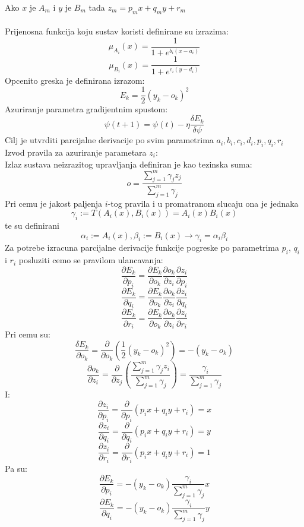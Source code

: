 \documentclass[a4paper, 11pt]{article}
\begin{document}
Ako $x$ je $A_{m}$ i $y$ je $B_{m}$ tada $z_{m}=p_{m}x+q_{m}y+r_{m}$\\
\\
Prijenosna funkcija koju sustav koristi definirane su izrazima:
$$\mu_{A_{i}}(x)=\frac{1}{1+e^{b_{i}(x-a_{i})}}$$
$$\mu_{B_{i}}(x)=\frac{1}{1+e^{c_{i}(y-d_{i})}}$$
Opcenito greska je definirana izrazom:
$$E_{k}=\frac{1}{2}(y_{k}-o_{k})^{2}$$
Azuriranje parametra gradijentnim spustom:
$$\psi(t+1) = \psi(t)-\eta\frac{\delta E_{k}}{\delta\psi}$$
Cilj je utvrditi parcijalne derivacije po svim parametrima $a_{i},b_{i},c_{i},d_{i},p_{i},q_{i},r_{i}$\\
Izvod pravila za azuriranje parametara $z_{i}$:\\
Izlaz sustava neizrazitog upravljanja definiran je kao tezinska suma:
$$o = \frac{\sum_{j=1}^{m}\gamma_{j}z_{j}}{\sum_{j=1}^{m}\gamma_{j}}$$
Pri cemu je jakost paljenja $i$-tog pravila i u promatranom slucaju ona je jednaka 
$$\gamma _{i} := T(A_{i}(x),B_{i}(x)) = A_{i}(x)B_{i}(x)$$ te su definirani 
$$\alpha_{i} := A_{i}(x),\beta_{i} := B_{i}(x) \rightarrow \gamma_{i} = \alpha_{i}\beta_{i}$$
Za potrebe izracuna parcijalne derivacije funkcije pogreske po parametrima $p_{i}$, $q_{i}$ i $r_{i}$ posluziti cemo se pravilom ulancavanja:
$$\frac{\partial E_{k}}{\partial p_{i}}=\frac{\partial E_{k}}{\partial o_{k}}\frac{\partial o_{k}}{\partial z_{i}}\frac{\partial z_{i}}{\partial p_{i}}$$
$$\frac{\partial E_{k}}{\partial q_{i}}=\frac{\partial E_{k}}{\partial o_{k}}\frac{\partial o_{k}}{\partial z_{i}}\frac{\partial z_{i}}{\partial q_{i}}$$
$$\frac{\partial E_{k}}{\partial r_{i}}=\frac{\partial E_{k}}{\partial o_{k}}\frac{\partial o_{k}}{\partial z_{i}}\frac{\partial z_{i}}{\partial r_{i}}$$
Pri cemu su:
\newcommand{\minusdEkdok}{(y_{k}-o_{k})}
$$\frac{\delta E_{k}}{\partial o_{k}} = \frac{\partial}{\partial o_{k}}\left (\frac{1}{2}(y_{k}-o_{k})^{2}\right )=-\minusdEkdok$$
\newcommand{\dokdzi}{\frac{\gamma_{i}}{\sum_{j=1}^{m}\gamma_{j}}}
\newcommand{\outfunc}{p_{i}x+q_{i}y+r_{i}}
$$\frac{\partial o_{k}}{\partial z_{i}} = \frac{\partial}{\partial z_{j}}\left (\frac{\sum_{j=1}^{m}\gamma_{j}z_{i}}{\sum_{j=1}^{m}\gamma_{j}}\right ) = \dokdzi$$
I:
$$\frac{\partial z_{i}}{\partial p_{i}} = \frac{\partial}{\partial p_{i}}(\outfunc) = x$$
$$\frac{\partial z_{i}}{\partial q_{i}} = \frac{\partial}{\partial q_{i}}(\outfunc) = y$$
$$\frac{\partial z_{i}}{\partial r_{i}} = \frac{\partial}{\partial r_{i}}(\outfunc) = 1$$
Pa su:
$$\frac{\partial E_{k}}{\partial p_{i}}=-\minusdEkdok\dokdzi x$$
$$\frac{\partial E_{k}}{\partial q_{i}}=-\minusdEkdok\dokdzi y$$
\end{document}
